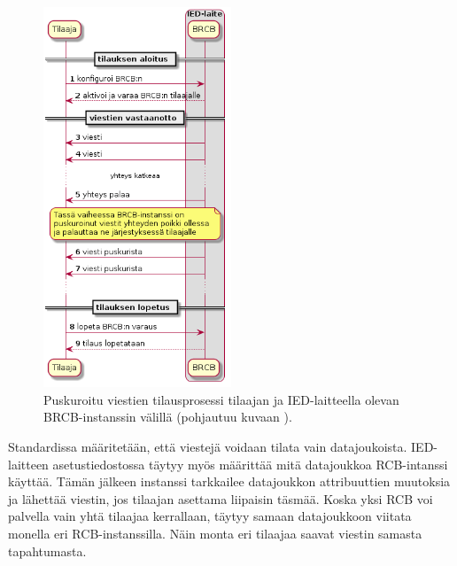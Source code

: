 \begin{figure}[ht!]
	\includegraphics[width=0.5\textwidth]{pictures/iec61850-brcb-communication.png}
	\caption{Puskuroitu viestien tilausprosessi tilaajan ja IED-laitteella olevan BRCB-instanssin välillä (pohjautuu kuvaan \mbox{\cite[s.~42]{IEC61850-7-1}}).}
	\label{fig:iec61850-brcb-communication}
\end{figure}

Standardissa määritetään, että viestejä voidaan tilata vain datajoukoista. IED-laitteen asetustiedostossa täytyy myös määrittää mitä datajoukkoa RCB-intanssi käyttää. Tämän jälkeen instanssi tarkkailee datajoukkon attribuuttien muutoksia ja lähettää viestin, jos tilaajan asettama liipaisin täsmää. Koska yksi RCB voi palvella vain yhtä tilaajaa kerrallaan, täytyy samaan datajoukkoon viitata monella eri RCB-instanssilla. Näin monta eri tilaajaa saavat viestin samasta tapahtumasta.

